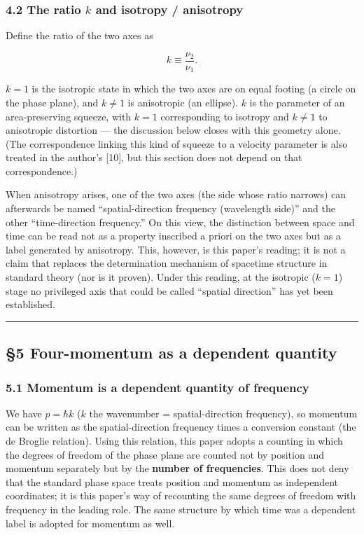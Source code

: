 \documentclass[
]{article}
\begin{document}
\subsubsection{\texorpdfstring{4.2 The ratio \(k\) and isotropy /
anisotropy}{4.2 The ratio k and isotropy / anisotropy}}\label{the-ratio-k-and-isotropy-anisotropy}

Define the ratio of the two axes as

\[k\equiv\frac{\nu_2}{\nu_1}.\]

\(k=1\) is the isotropic state in which the two axes are on equal
footing (a circle on the phase plane), and \(k\neq1\) is anisotropic (an
ellipse). \(k\) is the parameter of an area-preserving squeeze, with
\(k=1\) corresponding to isotropy and \(k\neq1\) to anisotropic
distortion --- the discussion below closes with this geometry alone.
(The correspondence linking this kind of squeeze to a velocity parameter
is also treated in the author's {[}10{]}, but this section does not
depend on that correspondence.)

When anisotropy arises, one of the two axes (the side whose ratio
narrows) can afterwards be named ``spatial-direction frequency
(wavelength side)'' and the other ``time-direction frequency.'' On this
view, the distinction between space and time can be read not as a
property inscribed a priori on the two axes but as a label generated by
anisotropy. This, however, is this paper's reading; it is not a claim
that replaces the determination mechanism of spacetime structure in
standard theory (nor is it proven). Under this reading, at the isotropic
(\(k=1\)) stage no privileged axis that could be called ``spatial
direction'' has yet been established.

\begin{center}\rule{0.5\linewidth}{0.5pt}\end{center}

\subsection{§5 Four-momentum as a dependent
quantity}\label{four-momentum-as-a-dependent-quantity}

\subsubsection{5.1 Momentum is a dependent quantity of
frequency}\label{momentum-is-a-dependent-quantity-of-frequency}

We have \(p=\hbar k\) (\(k\) the wavenumber = spatial-direction
frequency), so momentum can be written as the spatial-direction
frequency times a conversion constant (the de Broglie relation). Using
this relation, this paper adopts a counting in which the degrees of
freedom of the phase plane are counted not by position and momentum
separately but by the \textbf{number of frequencies}. This does not deny
that the standard phase space treats position and momentum as
independent coordinates; it is this paper's way of recounting the same
degrees of freedom with frequency in the leading role. The same
structure by which time was a dependent label is adopted for momentum as
well.
\end{document}
